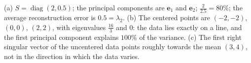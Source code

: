 \documentclass[11pt]{article}
\DeclareMathOperator{\diag}{diag}
\begin{document}
\begin{description}[leftmargin=0pt, itemsep=0.3em]
    \item[\ref{pr:pca}.] (a) $S = \diag(2, 0.5)$; the principal components are $\mathbf{e}_1$ and $\mathbf{e}_2$; $\frac{2}{2.5} = 80\%$; the average reconstruction error is $0.5 = \lambda_2$. (b) The centered points are $(-2, -2)$, $(0, 0)$, $(2, 2)$, with eigenvalues $\frac{16}{3}$ and $0$: the data lies exactly on a line, and the first principal component explains $100\%$ of the variance. (c) The first right singular vector of the uncentered data points roughly towards the mean $(3, 4)$, not in the direction in which the data varies.
\end{description}
\end{document}
